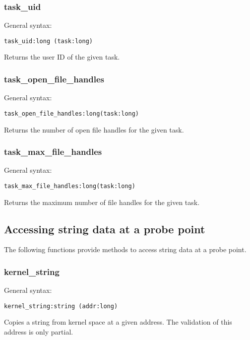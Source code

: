 \documentclass[twoside,english]{article}
\newenvironment{vindent}
{\begin{list}{}{\setlength{\listparindent}{6pt}}
\item[]}
{\end{list}}
\begin{document}
\subsubsection{task\_uid}
General syntax:

\begin{vindent}
\begin{verbatim}
task_uid:long (task:long)
\end{verbatim}
\end{vindent}
Returns the user ID of the given task.


\subsubsection{task\_open\_file\_handles}
General syntax:

\begin{vindent}
\begin{verbatim}
task_open_file_handles:long(task:long)
\end{verbatim}
\end{vindent}
Returns the number of open file handles for the given task.


\subsubsection{task\_max\_file\_handles}
General syntax:

\begin{vindent}
\begin{verbatim}
task_max_file_handles:long(task:long)
\end{verbatim}
\end{vindent}
Returns the maximum number of file handles for the given task.


\subsection{Accessing string data at a probe point}

The following functions provide methods to access string data at a probe
point.


\subsubsection{kernel\_string}
General syntax:

\begin{vindent}
\begin{verbatim}
kernel_string:string (addr:long)
\end{verbatim}
\end{vindent}
Copies a string from kernel space at a given address. The validation of this
address is only partial.
\end{document}

